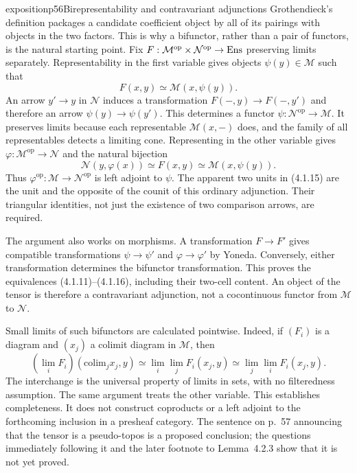 

\begin{dcomment}{exposition}{p56}{Birepresentability and contravariant adjunctions}
Grothendieck's definition packages a candidate coefficient object by all of its pairings with objects in the two factors. This is why a bifunctor, rather than a pair of functors, is the natural starting point. Fix $F:\mathcal M^{\mathrm{op}}\times\mathcal N^{\mathrm{op}}\to\mathrm{Ens}$ preserving limits separately. Representability in the first variable gives objects $\psi(y)\in\mathcal M$ such that
\[
 F(x,y)\simeq\mathcal M(x,\psi(y)).
\]
An arrow $y'\to y$ in $\mathcal N$ induces a transformation $F(-,y)\to F(-,y')$ and therefore an arrow $\psi(y)\to\psi(y')$. This determines a functor $\psi:\mathcal N^{\mathrm{op}}\to\mathcal M$. It preserves limits because each representable $\mathcal M(x,-)$ does, and the family of all representables detects a limiting cone. Representing in the other variable gives $\varphi:\mathcal M^{\mathrm{op}}\to\mathcal N$ and the natural bijection
\[
 \mathcal N(y,\varphi(x))\simeq F(x,y)
 \simeq\mathcal M(x,\psi(y)).
\]
Thus $\varphi^{\mathrm{op}}:\mathcal M\to\mathcal N^{\mathrm{op}}$ is left adjoint to $\psi$. The apparent two units in (4.1.15) are the unit and the opposite of the counit of this ordinary adjunction. Their triangular identities, not just the existence of two comparison arrows, are required.

The argument also works on morphisms. A transformation $F\to F'$ gives compatible transformations $\psi\to\psi'$ and $\varphi\to\varphi'$ by Yoneda. Conversely, either transformation determines the bifunctor transformation. This proves the equivalences (4.1.11)--(4.1.16), including their two-cell content. An object of the tensor is therefore a contravariant adjunction, not a cocontinuous functor from $\mathcal M$ to $\mathcal N$.

Small limits of such bifunctors are calculated pointwise. Indeed, if $(F_i)$ is a diagram and $(x_j)$ a colimit diagram in $\mathcal M$, then
\[
 \left(\lim_iF_i\right)(\mathrm{colim}_jx_j,y)
 \simeq\lim_i\lim_jF_i(x_j,y)
 \simeq\lim_j\lim_iF_i(x_j,y).
\]
The interchange is the universal property of limits in sets, with no filteredness assumption. The same argument treats the other variable. This establishes completeness. It does not construct coproducts or a left adjoint to the forthcoming inclusion in a presheaf category. The sentence on p.~57 announcing that the tensor is a pseudo-topos is a proposed conclusion; the questions immediately following it and the later footnote to Lemma~4.2.3 show that it is not yet proved.


\end{dcomment}
